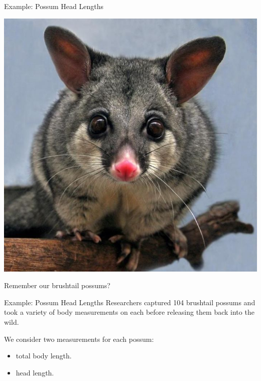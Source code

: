 \begin{frame}{Example: Possum Head Lengths}
    \begin{center}
        \includegraphics[scale=0.25]{images/possum.jpg}
    \end{center}
    Remember our brushtail possums?
\end{frame}

\begin{frame}{Example: Possum Head Lengths}
    Researchers captured 104 brushtail possums and took a variety of body measurements on each before releasing them back into the wild.
    
    \vspace{12pt}We consider two measurements for each possum:
    \begin{itemize}
        \item total body length.
        \item head length.
    \end{itemize}
\end{frame}

